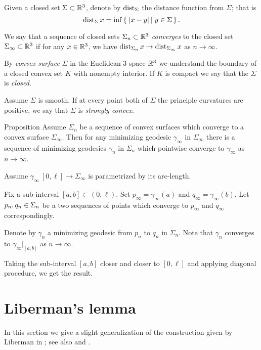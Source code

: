 \documentclass[a4paper,10pt]{article}
\begin{document}
Given a closed set $\Sigma\subset \mathbb{R}^3$,
denote by $\operatorname{dist}_\Sigma$ the distance function from $\Sigma$;
that is 
\[\dist_\Sigma x=\inf\set{|x-y|}{y\in\Sigma}.\]

We say that a sequence of closed sets $\Sigma_n\subset \mathbb{R}^3$
\emph{converges} to the closed set $\Sigma_\infty\subset \mathbb{R}^3$ 
if for any $x\in\mathbb{R}^3$,
we have
$\operatorname{dist}_{\Sigma_n}x\to\operatorname{dist}_{\Sigma_\infty}x$ as $n\to\infty$.


By \emph{convex surface} $\Sigma$ in the Euclidean 3-space $\mathbb{R}^3$ we understand the boundary of a closed convex set $K$ with nonempty interior.
If $K$ is compact we say that the $\Sigma$ is \emph{closed}.

Assume $\Sigma$ is smooth.
If at every point both of $\Sigma$
the principle curvatures are positive, 
we say that $\Sigma$ is \emph{strongly convex}. 

\begin{thm}{Proposition}\label{prop:convegence}
Assume $\Sigma_n$ be a sequence of convex surfaces which converge to a convex surface $\Sigma_\infty$.
Then for any minimizing geodesic $\gamma_\infty$ in $\Sigma_\infty$ there is a sequence of minimizing geodesics $\gamma_n$ in $\Sigma_n$ which pointwise converge to $\gamma_\infty$ as $n\to \infty$.
\end{thm}

Assume $\gamma_\infty\:[0,\ell]\to\Sigma_\infty$ is parametrized by its arc-length.

Fix a sub-interval $[a,b]\subset (0,\ell)$.
Set $p_\infty=\gamma_\infty(a)$ and $q_\infty=\gamma_\infty(b)$.
Let $p_n,q_n\zz\in\Sigma_n$ be a two sequences of points which converge to $p_\infty$ and $q_\infty$ 
correspondingly.

Denote by $\gamma_n$ a minimizing geodesic from $p_n$ to $q_n$ in $\Sigma_n$.
Note that $\gamma_n$ converges to $\gamma_\infty|_{[a,b]}$
as $n\to\infty$.

Taking the sub-interval  $[a,b]$ closer and closer to $[0,\ell]$
and applying diagonal procedure, we get the result.
\qeds

\section{Liberman's lemma}

In this section we give a slight generalization 
of the construction given by Liberman in \cite{liberman};
see also \cite{milka-liberman} and \cite{petrunin}.
\end{document}
